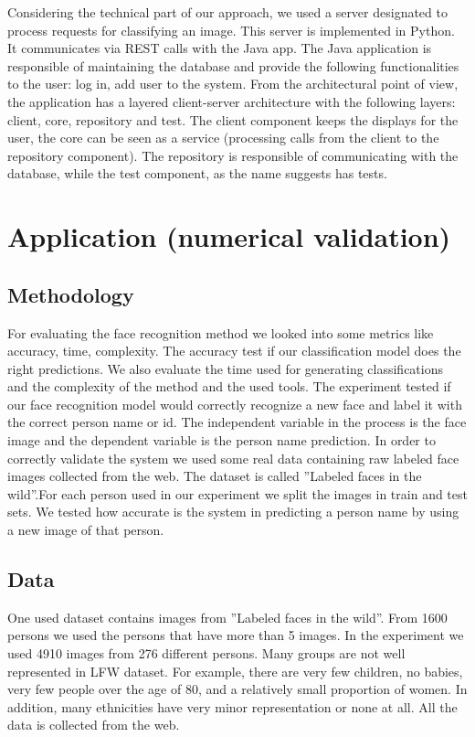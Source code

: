 \documentclass[runningheads,a4paper,11pt]{report}
\begin{document}
Considering the technical part of our approach, we used a server designated to process requests for classifying an image. This server is implemented in Python. It communicates via REST calls with the Java app. The Java application is responsible of maintaining the database and provide the following functionalities to the user: log in, add user to the system. From the architectural point of view, the application has a layered client-server architecture with the following layers: client, core, repository and test. The client component keeps the displays for the user, the core can be seen as a service (processing calls from the client to the repository component). The repository is responsible of communicating with the database, while the test component, as the name suggests has tests.

\chapter{Application (numerical validation)}
\label{chapter:application}


\section{Methodology}
\label{section:methodology}

For evaluating the face recognition method we looked into some metrics like accuracy, time, complexity. The accuracy test if our classification model does the right predictions. We also evaluate the time used for generating classifications and the complexity of the method and the used tools.
The experiment tested if our face recognition model would correctly recognize a new face and label it with the correct person name or id.
The independent variable in the process is the face image and the dependent variable is the person name prediction. In order to correctly validate the system we used some real data containing raw labeled face images collected from the web. The dataset is called ''Labeled faces in the wild''.For each person used in our experiment we split the images in train and test sets. We tested how accurate is the system in predicting a person name by using a new image of that person.


\section{Data}
\label{section:data}

One used dataset contains images from ''Labeled faces in the wild''. From 1600 persons we used the persons that have more than 5 images. In the experiment we used 4910 images from 276 different persons. Many groups are not well represented in LFW dataset. For example, there are very few children, no babies, very few people over the age of 80, and a relatively small proportion of women. In addition, many ethnicities have very minor representation or none at all. All the data is collected from the web.
\end{document}
